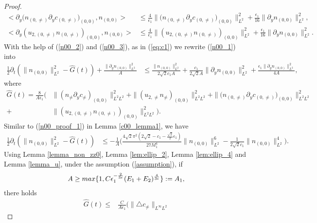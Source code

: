 \documentclass[12pt, reqno]{amsart}
\numberwithin{equation}{section}
\begin{document}
\begin{proof}
\begin{equation}
\begin{aligned}
				<\partial_{y}\big(n_{(0,\neq)}\partial_{y}c_{(0,\neq)} \big)_{(0,0)},n_{(0,0)}>
				&\leq \frac{4}{\epsilon_1}\|\big(n_{(0,\neq)}\partial_{y}c_{(0,\neq)} \big)_{(0,0)}\|^2_{L^2}+\frac{\epsilon_1}{16}\|\partial_{y} n_{(0,0)}\|^2_{L^2},\\
				<\partial_{y}\left(u_{2,(0,\neq)}n_{(0,\neq)}\right)_{(0,0)} ,n_{(0,0)}>
				&\leq \frac{4}{\epsilon_1}\|(u_{2,(0,\neq)}n_{(0,\neq)})_{(0,0)}\|^2_{L^2}
				+\frac{\epsilon_1}{16}\|\partial_{y} n_{(0,0)}\|^2_{L^2}.
			\end{aligned}
		\end{equation}
		With the help of (\ref{n00_2}) and (\ref{n00_3}), as in (\ref{eq:c1}) we rewrite (\ref{n00_1}) into
		\begin{equation*}%
			\begin{aligned}
				\frac{1}{2}\partial_t(\|n_{(0,0)}\|^2_{L^2}-\hat{G}(t))
				+\frac{\|\partial_{y} n_{(0,0)}\|^2_{L^2}}{A}
				&\leq\frac{\|n_{(0,0)}\|^2_{L^2}}{2\sqrt{2}c_1A}+\frac{c_1}{2\sqrt{2}A}\|\partial_{y} n_{(0,0)}\|^2_{L^2}+\frac{\epsilon_1\|\partial_{y} n_{(0,0)}\|^2_{L^2}}{4A},
			\end{aligned}
		\end{equation*}
		where 
		\begin{align*}
			\hat{G}(t)=\frac{8}{A\epsilon_1}\Big(&\|(n_{\neq}\partial_y c_{\neq})_{(0,0)}\|^2_{L^2L^2}
			+\|(u_{2,\neq}n_{\neq})_{(0,0)}\|^2_{L^2L^2}
			+\|\big(n_{(0,\neq)}\partial_{y}c_{(0,\neq)} \big)_{(0,0)}\|^2_{L^2L^2}\\
			+&\|(u_{2,(0,\neq)}n_{(0,\neq)})_{(0,0)}\|^2_{L^2L^2}\Big).
		\end{align*}
		Similar to (\ref{n00_proof_1}) in Lemma \ref{c00_lemma1}, we have
		\begin{equation}\label{n00_5}
			\begin{aligned}
				\frac{1}{2}\partial_t(\|n_{(0,0)}\|^2_{L^2}-\hat{G}(t))
				&\leq
				-\frac{1}{A}\Big(\frac{4\sqrt{2}\pi^2(2\sqrt{2}-c_1-\frac{\sqrt{2}}{2}\epsilon_1)}{27M_1^4}\|n_{(0,0)}\|_{L^2}^6-\frac{1}{2\sqrt{2}c_1}\|n_{(0,0)}\|^4_{L^2}\Big).
			\end{aligned}
		\end{equation}
		Using Lemma \ref{lemma_non_zz0}, Lemma \ref{lem:ellip_2}, Lemma \ref{lem:ellip_4} and Lemma \ref{lemma_u}, under the assumption (\ref{assumption}), if $$A\geq{\rm max}\{1,C\epsilon_1^{-\frac{2}{3\epsilon}}(E_1+E_{2})^{\frac{4}{3\epsilon}}\}:=A_1,$$ there holds
		\begin{align*}
			\hat{G}(t)\leq&\frac{C}{A\epsilon_1}\Big(\|\triangle c_{\neq}\|_{L^{\infty}L^2}

\end{align*}
\end{proof}
\end{document}
